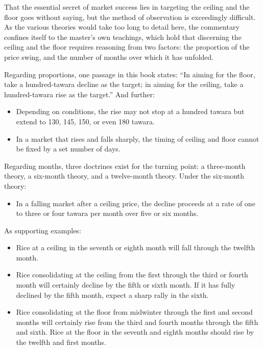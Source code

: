 \commentary
That the essential secret of market success lies in targeting the
ceiling and the floor goes without saying, but the method of
observation is exceedingly difficult. As the various theories
would take too long to detail here, the commentary confines itself
to the master's own teachings, which hold that discerning the
ceiling and the floor requires reasoning from two factors: the
proportion of the price swing, and the number of months over which
it has unfolded.

Regarding proportions, one passage in this book states: ``In aiming
for the floor, take a hundred-tawara decline as the target; in
aiming for the ceiling, take a hundred-tawara rise as the target.''
And further:

\begin{itemize}[nosep]
\item Depending on conditions, the rise may not stop at a hundred
  tawara but extend to 130, 145, 150, or even 180 tawara.
\item In a market that rises and falls sharply, the timing of ceiling
  and floor cannot be fixed by a set number of days.
\end{itemize}

Regarding months, three doctrines exist for the turning point:
a three-month theory, a six-month theory, and a twelve-month
theory. Under the six-month theory:

\begin{itemize}[nosep]
\item In a falling market after a ceiling price, the decline proceeds
  at a rate of one to three or four tawara per month over five or
  six months.
\end{itemize}

As supporting examples:

\begin{itemize}[nosep]
\item Rice at a ceiling in the seventh or eighth month will fall
  through the twelfth month.
\item Rice consolidating at the ceiling from the first through the
  third or fourth month will certainly decline by the fifth or
  sixth month. If it has fully declined by the fifth month, expect
  a sharp rally in the sixth.
\item Rice consolidating at the floor from midwinter through the first
  and second months will certainly rise from the third and fourth
  months through the fifth and sixth. Rice at the floor in the
  seventh and eighth months should rise by the twelfth and first
  months.
\end{itemize}

